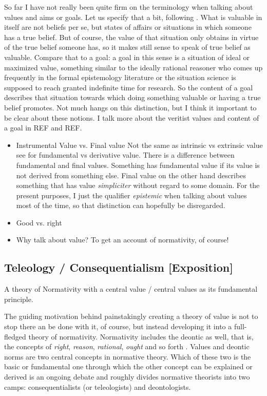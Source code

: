 \documentclass[12pt,numbers=noenddot]{scrartcl}
\begin{document}
So far I have not really been quite firm on the terminology when talking about values and aims or goals. Let us specify that a bit, following \textcite[344f.]{Berker2013-BERETA-2}. What is valuable in itself are not beliefs per se, but states of affairs or situations in which someone has a true belief. But of course, the value of that situation only obtains in virtue of the true belief someone has, so it makes still sense to speak of true belief as valuable. Compare that to a goal: a goal in this sense is a situation of ideal or maximized value, something similar to the ideally rational reasoner who comes up frequently in the formal epistemology literature or the situation science is supposed to reach granted indefinite time for research. So the content of a goal describes that situation towards which doing something valuable or having a true belief promotes. Not much hangs on this distinction, but I think it important to be clear about these notions. I talk more about the veritist values and content of a goal in REF and REF.
\begin{itemize}
    \item{ Instrumental Value vs. Final value }
    Not the same as intrinsic vs extrinsic value
    see \textcite{Sosa2007-SOSAVE-2} for fundamental vs derivative value. There is a difference between fundamental and final values. Something has fundamental value if its value is not derived from something else. Final value on the other hand describes something that has value \emph{simpliciter} without regard to some domain. For the present purposes, I just the qualifier \emph{epistemic} when talking about values most of the time, so that distinction can hopefully be disregarded.
    \item{ Good vs. right }
    \item{ Why talk about value? To get an account of normativity, of course! }
\end{itemize}


\subsection{ Teleology / Consequentialism [Exposition]} \label{subsec: teleology}
A theory of Normativity with a central value / central values as its fundamental principle.

The guiding motivation behind painstakingly creating a theory of value is not to stop there an be done with it, of course, but instead developing it into a full-fledged theory of normativity. Normativity includes the deontic as well, that is, the concepts of \emph{right}, \emph{reason}, \emph{rational}, \emph{ought} and so forth \autocite[21]{sep-value-theory}. Values and deontic norms are two central concepts in normative theory. Which of these two is the basic or fundamental one through which the other concept can be explained or derived is an ongoing debate and roughly divides normative theorists into two camps: consequentialists (or teleologists) and deontologists. 
\end{document}
